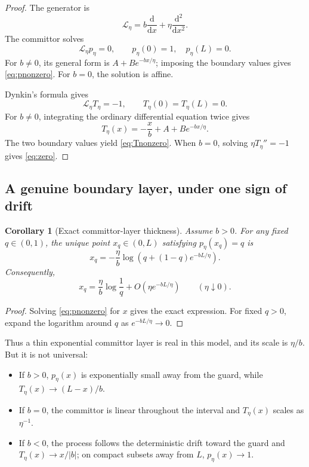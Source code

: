 \documentclass[11pt]{article}
\newtheorem{corollary}[theorem]{Corollary}
\theoremstyle{definition}
\theoremstyle{remark}
\newcommand{\cL}{\mathcal L}
\newcommand{\dd}{\mathrm d}
\begin{document}
\begin{proof}
The generator is
\[
 \cL_\eta=b\frac{\dd}{\dd x}
 +\eta\frac{\dd^2}{\dd x^2}.
\]
The committor solves
\[
 \cL_\eta p_\eta=0,
 \qquad p_\eta(0)=1,\quad p_\eta(L)=0.
\]
For \(b\ne0\), its general form is
\(A+Be^{-bx/\eta}\); imposing the boundary values gives
\eqref{eq:pnonzero}.  For \(b=0\), the solution is affine.

Dynkin's formula gives
\[
 \cL_\eta T_\eta=-1,
 \qquad T_\eta(0)=T_\eta(L)=0.
\]
For \(b\ne0\), integrating the ordinary differential equation twice gives
\[
 T_\eta(x)=-\frac{x}{b}+A+Be^{-bx/\eta}.
\]
The two boundary values yield \eqref{eq:Tnonzero}.  When \(b=0\), solving
\(\eta T_\eta''=-1\) gives \eqref{eq:zero}.
\end{proof}

\subsection{A genuine boundary layer, under one sign of drift}

\begin{corollary}[Exact committor-layer thickness]
\label{cor:thickness}
Assume \(b>0\).  For any fixed \(q\in(0,1)\), the unique point
\(x_q\in(0,L)\) satisfying \(p_\eta(x_q)=q\) is
\[
 x_q
 =
 -\frac{\eta}{b}
 \log\!\left(q+(1-q)e^{-bL/\eta}\right).
\]
Consequently,
\[
 x_q
 =
 \frac{\eta}{b}\log\frac1q
 +
 O\!\left(\eta e^{-bL/\eta}\right)
 \qquad(\eta\downarrow0).
\]
\end{corollary}

\begin{proof}
Solving \eqref{eq:pnonzero} for \(x\) gives the exact expression.
For fixed \(q>0\), expand the logarithm around \(q\) as
\(e^{-bL/\eta}\to0\).
\end{proof}

Thus a thin exponential committor layer is real in this model, and its
scale is \(\eta/b\).  But it is not universal:
\begin{itemize}
\item If \(b>0\), \(p_\eta(x)\) is exponentially small away from the
      guard, while \(T_\eta(x)\to(L-x)/b\).
\item If \(b=0\), the committor is linear throughout the interval and
      \(T_\eta(x)\) scales as \(\eta^{-1}\).
\item If \(b<0\), the process follows the deterministic drift toward the
      guard and \(T_\eta(x)\to x/|b|\); on compact subsets away from \(L\),
      \(p_\eta(x)\to1\).
\end{itemize}
\end{document}
